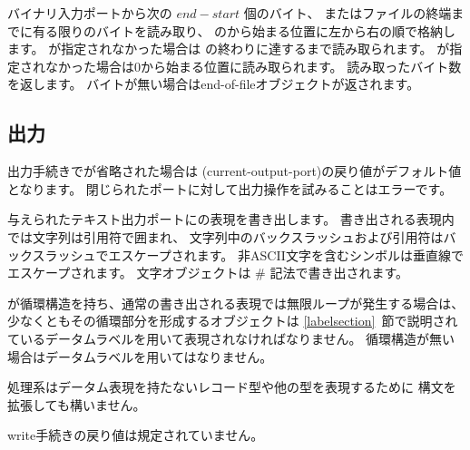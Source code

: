\begin{entry}{%
}

バイナリ入力ポートから次の $end - start$ 個のバイト、
またはファイルの終端までに有る限りのバイトを読み取り、
のから始まる位置に左から右の順で格納します。
が指定されなかった場合は
の終わりに達するまで読み取られます。
が指定されなかった場合は0から始まる位置に読み取られます。
読み取ったバイト数を返します。
バイトが無い場合はend-of-fileオブジェクトが返されます。

\end{entry}


\subsection{出力}
\label{outputsection}

出力手続きでが省略された場合は
{\cf (current-\+output-\+port)}の戻り値がデフォルト値となります。
閉じられたポートに対して出力操作を試みることはエラーです。

\noindent \hbox{}
\vspace{-5ex}

\begin{entry}{%
}

与えられたテキスト出力ポートにの表現を書き出します。
書き出される表現内では文字列は引用符で囲まれ、
文字列中のバックスラッシュおよび引用符はバックスラッシュでエスケープされます。
非ASCII文字を含むシンボルは垂直線でエスケープされます。
文字オブジェクトは {\cf \#\backwhack} 記法で書き出されます。

が循環構造を持ち、通常の書き出される表現では無限ループが発生する場合は、
少なくともその循環部分を形成するオブジェクトは
\ref{labelsection}~節で説明されているデータムラベルを用いて表現されなければなりません。
循環構造が無い場合はデータムラベルを用いてはなりません。

処理系はデータム表現を持たないレコード型や他の型を表現するために
構文を拡張しても構いません。

{\cf write}手続きの戻り値は規定されていません。

\end{entry}

